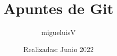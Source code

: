 \documentclass[12pt]{article}
\title{Apuntes de Git}
\author{migueluisV}
\date{Realizadas: Junio 2022}
\begin{document}
\renewcommand*\contentsname{Índice}
\renewcommand{\listfigurename}{Índice de Figuras}

\maketitle\newpage
\tableofcontents\newpage
\listoffigures\newpage



\end{document}
